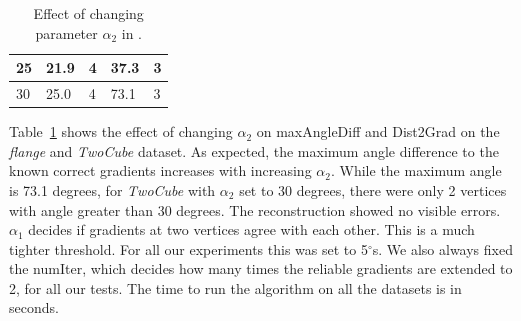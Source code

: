 \begin{table}[h]
\begin{tabular}{|l|l|l|l|l|}
        25                                                                                    & 21.9                                                               & 4                                                    & 37.3                    & 3                                                    \\ \hline
        30                                                                                    & 25.0                                                               & 4                                                    & 73.1                    & 3                                                    \\ \hline
    \end{tabular}
    \caption{Effect of changing parameter $\alpha_{2}$ in \protect\ReliGrad.}
    \label{table:parameter}
\end{table}
\normalsize
Table~\ref{table:parameter} shows the effect of changing $\alpha_{2}$ on maxAngleDiff and Dist2Grad on the \textit{flange} and \textit{TwoCube} dataset. As expected, the maximum angle difference to the known correct gradients increases with increasing $\alpha_{2}$. While the maximum angle is 73.1 degrees, for \textit{TwoCube} with $\alpha_{2}$ set to 30 degrees, there were only 2 vertices with angle greater than 30 degrees. The \MergeSharp reconstruction showed no visible errors. 
 $\alpha_{1}$ decides if gradients at two vertices agree with each other. This is a much tighter threshold. For all our experiments this was set to 5$^{\circ}$s. We also always fixed the numIter, which decides how many times the reliable gradients are extended to 2, for all our tests. 
 The time to run the algorithm on all the datasets is in seconds. 
